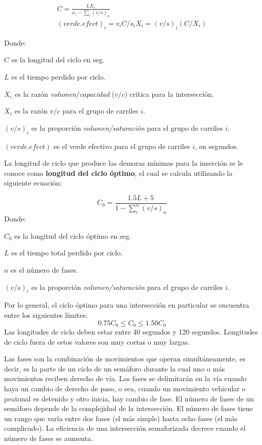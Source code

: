 $$
\begin{array}{c}
C = \displaystyle \frac{LX_c}{x_c - \sum_{i}(v/s)_a } \\[0.5cm]
(verde.efect)_i = v_iC/s_iX_i=(v/s)_i(C/X_i)
\end{array}
$$

Donde:
{\setlength{\baselineskip}{0.7\baselineskip}\begin{description}
	\item $C$ es la longitud del ciclo en seg.
	\item $L$ es el tiempo perdido por ciclo.
	\item $X_c$ es la razón \emph{volumen}/\emph{capacidad} ($v/c$) crítica para la intersección.
	\item $X_i$ es la razón $v/c$ para el grupo de carriles $i$.
	\item $(v/s)_i$ es la proporción \emph{volumen/saturación} para el grupo de carriles $i$.
	\item $(verde.efect)$ es el verde efectivo para el grupo de carriles $i$, en segundos.
\end{description}}

La longitud de ciclo que produce las demoras mínimas para la inserción se le conoce como \textbf{longitud del ciclo óptimo}, el cual se calcula utilizando la siguiente ecuación:

$$ C_0 = {\displaystyle \frac{1.5L + 5}{1 - \sum_i^n(v/s)_a}}  $$
Donde:
{\setlength{\baselineskip}{0.7\baselineskip}\begin{description}
		\item $C_0$ es la longitud del ciclo óptimo en seg.
		\item $L$ es el tiempo total perdido por ciclo.
		\item $n$ es el número de fases.
		\item $(v/s)_i$ es la proporción \emph{volumen/saturación} para el grupo de carriles $i$.
\end{description}}

Por lo general, el ciclo óptimo para una intersección en particular se encuentra entre los siguientes límites:
$$ 0.75C_0 \leq C_0 \leq 1.50C_0$$
Las longitudes de ciclo deben estar entre 40 segundos y 120 segundos. Longitudes de ciclo fuera de estos valores son muy cortas o muy largas.

Las fases son la combinación de movimientos que operan simultáneamente, es decir, es la parte de un ciclo de un semáforo durante la cual uno o más movimientos reciben derecho de vía. Las fases se delimitarán en la vía cuando haya un cambio de derecho de paso, o sea, cuando un movimiento vehicular o peatonal es detenido y otro inicia, hay cambio de fase. El número de fases de un semáforo depende de la complejidad de la intersección. El número de fases tiene un rango que varía entre dos fases (el más simple) hasta ocho fases (el más complicado). La eficiencia de una intersección semaforizada decrece cuando el número de fases se aumenta.

